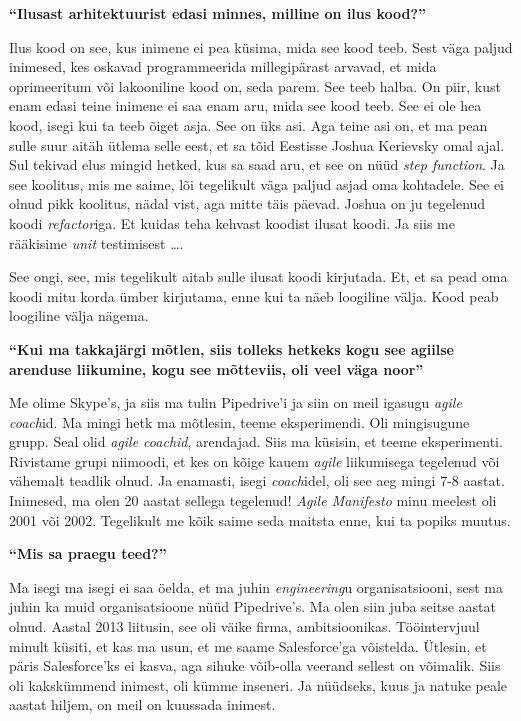 \textbf{\enquote{Ilusast arhitektuurist edasi minnes, milline on ilus kood?}}

Ilus kood on see, kus inimene ei pea küsima, mida see kood teeb. Sest väga paljud inimesed, kes oskavad programmeerida millegipärast arvavad, et mida oprimeeritum või lakooniline kood on, seda parem. See teeb halba. On piir, kust enam edasi teine inimene ei saa enam aru, mida see kood teeb. See ei ole hea kood, isegi kui ta teeb õiget asja. See on üks asi. Aga teine asi on, et ma pean sulle suur aitäh ütlema selle eest, et sa tõid Eestisse Joshua Kerievsky omal ajal. Sul tekivad elus mingid hetked, kus sa saad aru, et see on nüüd \emph{step function}. Ja see koolitus, mis me saime, lõi tegelikult väga paljud asjad oma kohtadele. See ei olnud pikk koolitus, nädal vist, aga mitte täis päevad. Joshua on ju tegelenud koodi \emph{refactor}iga. Et kuidas teha kehvast koodist ilusat koodi. Ja siis me rääkisime \emph{unit} testimisest \ldots.

See ongi, see, mis tegelikult aitab sulle ilusat koodi kirjutada. Et, et sa pead oma koodi mitu korda ümber kirjutama, enne kui ta näeb loogiline välja. Kood peab loogiline välja nägema.

\textbf{\enquote{Kui ma takkajärgi mõtlen, siis tolleks hetkeks kogu see agiilse arenduse liikumine, kogu see mõtteviis, oli veel väga noor}}

Me olime Skype's, ja siis ma tulin Pipedrive'i ja siin on meil igasugu \emph{agile coach}id. Ma mingi hetk ma mõtlesin, teeme eksperimendi. Oli mingisugune grupp. Seal olid \emph{agile coachid}, arendajad. Siis ma küsisin, et teeme eksperimenti. Rivistame grupi niimoodi, et kes on kõige kauem \emph{agile} liikumisega tegelenud  või vähemalt teadlik olnud. Ja enamasti, isegi \emph{coach}idel, oli see aeg mingi 7-8 aastat. Inimesed, ma olen 20 aastat sellega tegelenud! \emph{Agile Manifesto} minu meelest oli 2001 või 2002. Tegelikult me kõik saime seda maitsta enne, kui ta popiks muutus.

\textbf{\enquote{Mis sa praegu teed?}}

Ma isegi ma isegi ei saa öelda, et ma juhin \emph{engineering}u organisatsiooni, sest ma juhin ka muid organisatsioone nüüd Pipedrive's. Ma olen siin juba seitse aastat olnud. Aastal 2013 liitusin, see oli väike firma, ambitsioonikas. Tööintervjuul minult küsiti, et kas ma usun, et me saame Salesforce'ga võistelda. Ütlesin, et päris Salesforce'ks ei kasva, aga sihuke võib-olla veerand sellest on võimalik. Siis oli kakskümmend inimest, oli kümme inseneri. Ja nüüdseks, kuus ja natuke peale aastat hiljem, on meil on kuussada inimest.

